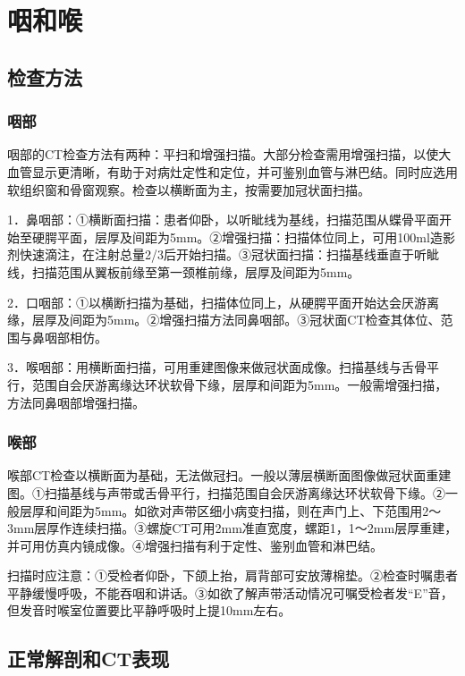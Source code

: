 \chapter{咽和喉}

\section{检查方法}

\subsection{咽部}

咽部的CT检查方法有两种：平扫和增强扫描。大部分检查需用增强扫描，以使大血管显示更清晰，有助于对病灶定性和定位，并可鉴别血管与淋巴结。同时应选用软组织窗和骨窗观察。检查以横断面为主，按需要加冠状面扫描。

1．鼻咽部：①横断面扫描：患者仰卧，以听眦线为基线，扫描范围从蝶骨平面开始至硬腭平面，层厚及间距为5mm。②增强扫描：扫描体位同上，可用100ml造影剂快速滴注，在注射总量2/3后开始扫描。③冠状面扫描：扫描基线垂直于听眦线，扫描范围从翼板前缘至第一颈椎前缘，层厚及间距为5mm。

2．口咽部：①以横断扫描为基础，扫描体位同上，从硬腭平面开始达会厌游离缘，层厚及间距为5mm。②增强扫描方法同鼻咽部。③冠状面CT检查其体位、范围与鼻咽部相仿。

3．喉咽部：用横断面扫描，可用重建图像来做冠状面成像。扫描基线与舌骨平行，范围自会厌游离缘达环状软骨下缘，层厚和间距为5mm。一般需增强扫描，方法同鼻咽部增强扫描。

\subsection{喉部}

喉部CT检查以横断面为基础，无法做冠扫。一般以薄层横断面图像做冠状面重建图。①扫描基线与声带或舌骨平行，扫描范围自会厌游离缘达环状软骨下缘。②一般层厚和间距为5mm。如欲对声带区细小病变扫描，则在声门上、下范围用2～3mm层厚作连续扫描。③螺旋CT可用2mm准直宽度，螺距1，1～2mm层厚重建，并可用仿真内镜成像。④增强扫描有利于定性、鉴别血管和淋巴结。

扫描时应注意：①受检者仰卧，下颌上抬，肩背部可安放薄棉垫。②检查时嘱患者平静缓慢呼吸，不能吞咽和讲话。③如欲了解声带活动情况可嘱受检者发“E”音，但发音时喉室位置要比平静呼吸时上提10mm左右。

\section{正常解剖和CT表现}

